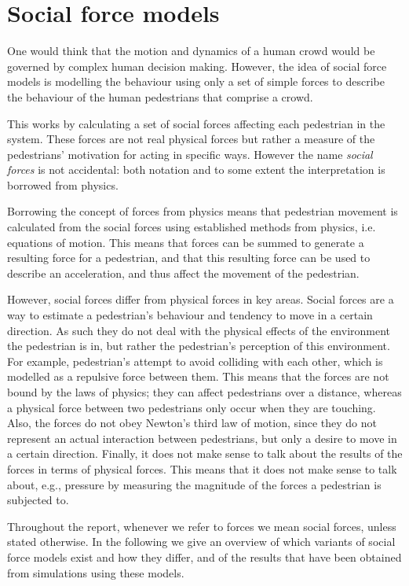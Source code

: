 \section{Social force models}
\label{sec:social-forces}
One would think that the motion and dynamics of a human crowd would be
governed by complex human decision making. However, the idea of social force
models is modelling the behaviour using only a set of simple forces to
describe the behaviour of the human pedestrians that comprise a crowd.

This works by calculating a set of social forces affecting each pedestrian in 
the system.  These forces are not real physical forces 
but rather a measure of the  pedestrians' 
motivation for acting in specific ways. However the name \emph{social forces}
is not accidental: both notation and to some extent the interpretation is
borrowed from physics.

Borrowing the concept of forces from physics 
means that pedestrian movement is calculated from the social forces using 
established methods from physics, i.e. equations of motion. This means 
that forces can be summed to generate a resulting force for a pedestrian, and 
that this resulting force can be used to describe an acceleration, and thus 
affect the movement of the pedestrian.

However, social forces differ from physical forces in key areas. Social forces 
are a way to estimate a pedestrian's behaviour and tendency to move in a 
certain direction. As such they do not deal with the physical effects of the 
environment the pedestrian is in, but rather the pedestrian's perception of 
this environment. For example, pedestrian's attempt to avoid colliding with 
each other, which is modelled as a repulsive force between them. This means 
that the forces are not bound by the laws of physics; they can affect 
pedestrians over a distance, whereas a physical force between two pedestrians 
only occur when they are touching. Also, the forces do not obey Newton's third 
law of motion, since they do not represent an actual interaction between 
pedestrians, but only a desire to move in a certain direction. Finally, it 
does not make sense to talk about the results of the forces in terms of 
physical forces. This means that it does not make sense to talk about, e.g., 
pressure by measuring the magnitude of the forces a pedestrian is subjected 
to.

Throughout the report, whenever we refer to forces we mean social forces, 
unless stated otherwise. In the following we give an overview of which 
variants of social force models exist and how they differ, and of the results 
that have been obtained from simulations using these models.

